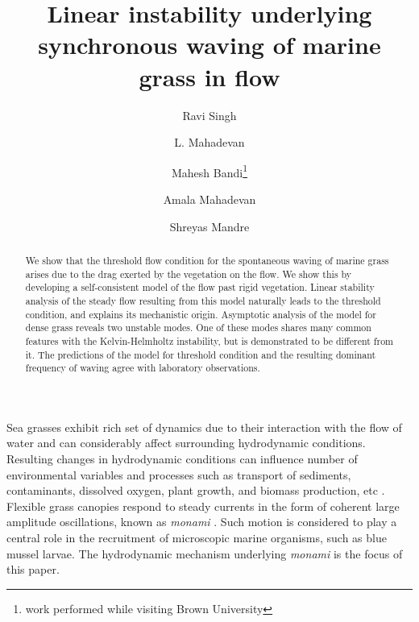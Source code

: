 \documentclass[aps,prl,reprint,twocolumn,showpacs,superscriptaddress,10pt]{revtex4-1}  %
\newcommand{\monami}{\textit{monami }}
\begin{document}
\title{Linear instability underlying synchronous waving of marine grass in flow}
\author{Ravi Singh}
\author{L. Mahadevan}
\author{Mahesh Bandi\thanks{work performed while visiting Brown University}}
\author{Amala Mahadevan}
\author{Shreyas Mandre}

\begin{abstract}
We show that the threshold flow condition for the spontaneous waving of marine grass arises due to the drag exerted by the vegetation on the flow. 
We show this by developing a self-consistent model of the flow past rigid vegetation. 
Linear stability analysis of the steady flow resulting from this model naturally leads to the threshold condition, and explains its mechanistic origin. 
Asymptotic analysis of the model for dense grass reveals two unstable modes. 
One of these modes shares many common features with the Kelvin-Helmholtz instability, but is demonstrated to be different from it. 
The predictions of the model for threshold condition and the resulting dominant frequency of waving agree with laboratory observations. 
\end{abstract}
\maketitle
Sea grasses exhibit rich set of dynamics due to their interaction with the flow of water and can considerably affect surrounding hydrodynamic conditions.
Resulting changes in hydrodynamic conditions can influence number of environmental variables and processes such as transport of sediments, contaminants, dissolved oxygen, plant growth, and biomass production, etc \cite{Fonseca87,Grizzle96,Nepf99,Nepf2012}. 
Flexible grass canopies respond to steady currents in the form of coherent large amplitude oscillations, known as \monami \cite{AckermanOkubo93}. Such motion is considered to play a central role in the recruitment 
of microscopic marine organisms, such as blue mussel larvae\cite{Grizzle96}.
The hydrodynamic mechanism underlying \monami is the focus of this paper. 
\end{document}
